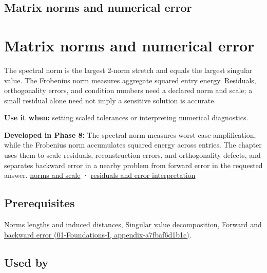 \hypertarget{appendix-f8657bac66e5}{}
\section*{Matrix norms and numerical error}
\chapter{Matrix norms and numerical error}\label{appendix-f8657bac66e5-matrix-norms-and-numerical-error}

The spectral norm is the largest 2-norm stretch and equals the largest singular value. The Frobenius norm measures aggregate squared entry energy. Residuals, orthogonality errors, and condition numbers need a declared norm and scale; a small residual alone need not imply a sensitive solution is accurate.

\textbf{Use it when:} setting scaled tolerances or interpreting numerical diagnostics.

\textbf{Developed in Phase 8:} The spectral norm measures worst-case amplification, while the Frobenius norm accumulates squared energy across entries. The chapter uses them to scale residuals, reconstruction errors, and orthogonality defects, and separates backward error in a nearby problem from forward error in the requested answer. \href{Continuous\%20Notes/Computing\%20Foundations\%20-\%20From\%20Bits\%20to\%20C++\%20and\%20Systems\%20APIs\#Matrix\%20norms\%20put\%20scale\%20into\%20error\%20statements}{norms and scale} · \href{Continuous\%20Notes/Computing\%20Foundations\%20-\%20From\%20Bits\%20to\%20C++\%20and\%20Systems\%20APIs\#Residuals\%20distinguish\%20backward\%20accuracy\%20from\%20forward\%20certainty}{residuals and error interpretation}

\section{Prerequisites}\label{appendix-f8657bac66e5-prerequisites}

\hyperref[appendix-49933872bb51]{Norms lengths and induced distances}, \hyperref[appendix-1fad5e7f36fa]{Singular value decomposition}, \href{../01-Foundations-I/main.pdf\#nameddest=appendix-a7fbaf6d1b1c}{Forward and backward error (01-Foundations-I, appendix-a7fbaf6d1b1c)}.

\section{Used by}\label{appendix-f8657bac66e5-used-by}

